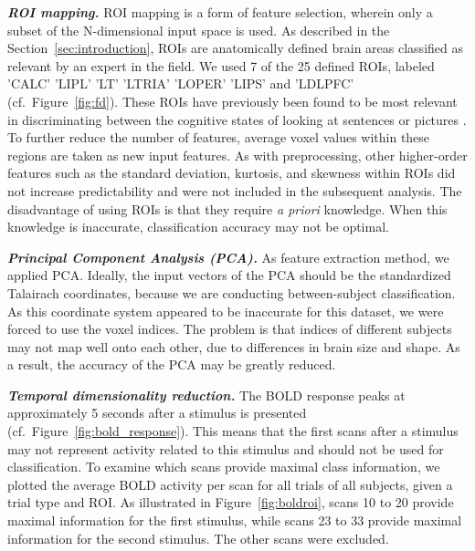 \documentclass[preprint,journal,11pt]{vgtc}
\begin{document}
\textbf{\emph{ROI mapping.}} ROI mapping is a form of feature selection, wherein only a subset of the N-dimensional input space is used. As described in the Section~\ref{sec:introduction}, ROIs are anatomically defined brain areas classified as relevant by an expert in the field. We used 7 of the 25 defined ROIs, labeled  'CALC' 'LIPL' 'LT' 'LTRIA' 'LOPER' 'LIPS' and  'LDLPFC' (cf.~Figure~\ref{fig:fd}). These ROIs have previously been found to be most relevant in discriminating between the cognitive states of looking at sentences or pictures \cite{wa:2003betw}. To further reduce the number of features, average voxel values within these regions are taken as new input features. As with preprocessing, other higher-order features such as the standard deviation, kurtosis, and skewness within ROIs did not increase predictability and were not included in the subsequent analysis. The disadvantage of using ROIs is that they require \emph{a priori} knowledge. When this knowledge is inaccurate, classification accuracy may not be optimal.

\textbf{\emph{Principal Component Analysis (PCA).}} As feature extraction method, we applied PCA. Ideally, the input vectors of the PCA should be the standardized Talairach coordinates, because we are conducting between-subject classification. As this coordinate system appeared to be inaccurate for this dataset, we were forced to use the voxel indices. The problem is that indices of different subjects may not map well onto each other, due to differences in brain size and shape. As a result, the accuracy of the PCA may be greatly reduced.

\textbf{\emph{Temporal dimensionality reduction.}} The BOLD response peaks at approximately 5 seconds after a stimulus is presented (cf.~Figure~\ref{fig:bold_response}). This means that the first scans after a stimulus may not represent activity related to this stimulus and should not be used for classification. To examine which scans provide maximal class information, we plotted the average BOLD activity per scan for all trials of all subjects, given a trial type and ROI. As illustrated in Figure~\ref{fig:boldroi}, scans 10 to 20 provide maximal information for the first stimulus, while scans 23 to 33 provide maximal information for the second stimulus. The other scans were excluded.
\end{document}
